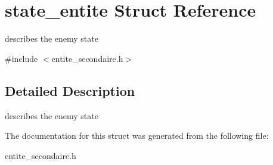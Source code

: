 \hypertarget{structstate__entite}{}\section{state\+\_\+entite Struct Reference}
\label{structstate__entite}


describes the enemy state  




{\ttfamily \#include $<$entite\+\_\+secondaire.\+h$>$}



\subsection{Detailed Description}
describes the enemy state 

The documentation for this struct was generated from the following file\+:\begin{DoxyCompactItemize}
\item 
entite\+\_\+secondaire.\+h\end{DoxyCompactItemize}

